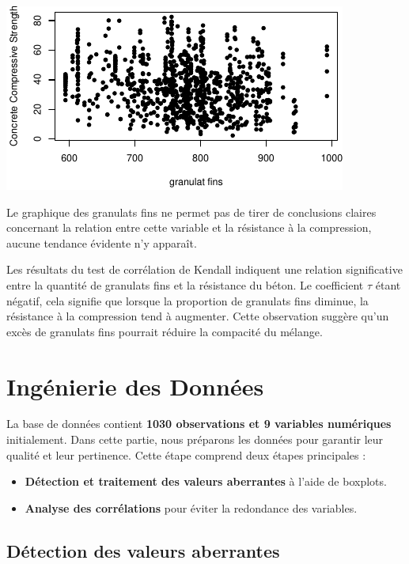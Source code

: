 \documentclass[
  12pt,
]{article}
\providecommand{\tightlist}{%
  \setlength{\itemsep}{0pt}\setlength{\parskip}{0pt}}
\begin{document}
\begin{center}\includegraphics{rmd_final_files/figure-latex/unnamed-chunk-23-1} \end{center}

Le graphique des granulats fins ne permet pas de tirer de conclusions
claires concernant la relation entre cette variable et la résistance à
la compression, aucune tendance évidente n'y apparaît.

Les résultats du test de corrélation de Kendall indiquent une relation
significative entre la quantité de granulats fins et la résistance du
béton. Le coefficient \(\tau\) étant négatif, cela signifie que lorsque
la proportion de granulats fins diminue, la résistance à la compression
tend à augmenter. Cette observation suggère qu'un excès de granulats
fins pourrait réduire la compacité du mélange.

\section{Ingénierie des Données}\label{inguxe9nierie-des-donnuxe9es}

La base de données contient \textbf{1030 observations et 9 variables
numériques} initialement. Dans cette partie, nous préparons les données
pour garantir leur qualité et leur pertinence. Cette étape comprend deux
étapes principales :

\begin{itemize}
\tightlist
\item
  \textbf{Détection et traitement des valeurs aberrantes} à l'aide de
  boxplots.\\
\item
  \textbf{Analyse des corrélations} pour éviter la redondance des
  variables.
\end{itemize}

\subsection{Détection des valeurs
aberrantes}\label{duxe9tection-des-valeurs-aberrantes}
\end{document}
